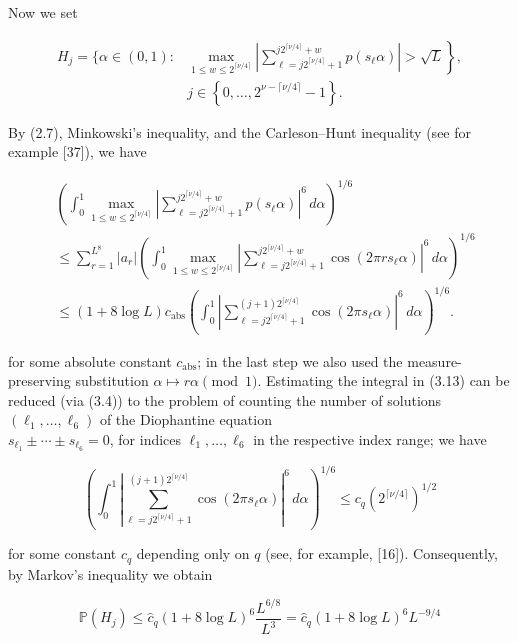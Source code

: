 \documentclass[10pt]{article}
\newcommand{\1}{\mathbf{1}}
\begin{document}
Now we set

$$
\begin{aligned}
H_{j}=\{\alpha \in(0,1): & \left.\max_{1\leqslant w\leqslant 2^{\lceil\nu/4\rceil}}\left|\sum_{\ell=j 2^{\lceil\nu / 4\rceil}+1}^{j 2^{\lceil\nu / 4\rceil}+w} p\left(s_{\ell} \alpha\right)\right|>\sqrt{L}\right\}, \\
& j \in\left\{0, \ldots, 2^{\nu-\lceil\nu/4\rceil}-1\right\} .
\end{aligned}
$$

By (2.7), Minkowski's inequality, and the Carleson--Hunt inequality (see for example [37]), we have


\begin{align*}
&\left(\int_0^1\max_{1\leqslant w\leqslant2^{\lceil\nu/4\rceil}}
 \left|\sum_{\ell=j2^{\lceil\nu/4\rceil}+1}^{j2^{\lceil\nu/4\rceil}+w}
 p(s_\ell\alpha)\right|^6\,d\alpha\right)^{1/6}\\
&\leqslant\sum_{r=1}^{L^8}|a_r|
 \left(\int_0^1\max_{1\leqslant w\leqslant2^{\lceil\nu/4\rceil}}
 \left|\sum_{\ell=j2^{\lceil\nu/4\rceil}+1}^{j2^{\lceil\nu/4\rceil}+w}
 \cos(2\pi r s_\ell\alpha)\right|^6\,d\alpha\right)^{1/6}\\
&\leqslant(1+8\log L)c_{\mathrm{abs}}
 \left(\int_0^1
 \left|\sum_{\ell=j2^{\lceil\nu/4\rceil}+1}^{(j+1)2^{\lceil\nu/4\rceil}}
 \cos(2\pi s_\ell\alpha)\right|^6\,d\alpha\right)^{1/6}. \tag{3.13}
\end{align*}


for some absolute constant $c_{\mathrm{abs}}$; in the last step we also used the measure-preserving substitution $\alpha\mapsto r\alpha\pmod 1$. Estimating the integral in (3.13) can be reduced (via (3.4)) to the problem of counting the number of solutions\\
$\left(\ell_{1}, \ldots, \ell_{6}\right)$ of the Diophantine equation\\
$s_{\ell_{1}} \pm \cdots \pm s_{\ell_{6}}=0$, for indices $\ell_{1}, \ldots, \ell_{6}$ in the respective index range; we have

$$
\left(\int_0^1\left|
\sum_{\ell=j2^{\lceil\nu/4\rceil}+1}^{(j+1)2^{\lceil\nu/4\rceil}}
\cos(2\pi s_\ell\alpha)\right|^6\,d\alpha\right)^{1/6}
\leqslant c_q\left(2^{\lceil\nu/4\rceil}\right)^{1/2}
$$

for some constant $c_{q}$ depending only on $q$ (see, for example, [16]). Consequently, by Markov's inequality we obtain

$$
\mathbb{P}\left(H_{j}\right) \leqslant \hat{c}_{q}(1+8 \log L)^{6} \frac{L^{6 / 8}}{L^{3}}=\hat{c}_{q}(1+8 \log L)^{6} L^{-9 / 4}
$$
\end{document}
